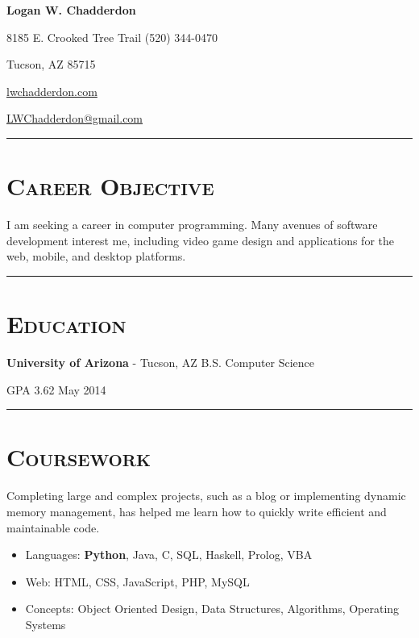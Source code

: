 \documentclass[11pt,letterpaper]{article}
\newcommand{\Hsep}{\vspace{4mm} \hrule \vspace{-1mm}}
\begin{document}
\begin{minipage}{\textwidth}

\begin{center}
\LARGE \bfseries Logan W. Chadderdon
\end{center}

8185 E. Crooked Tree Trail \hfill (520) 344-0470

\vspace{-3mm}
\begin{multicols}{3}
Tucson, AZ 85715 

\begin{center}
\href{http://lwchadderdon.com}{lwchadderdon.com}
\end{center}

\hfill \href{mailto:LWChadderdon@gmail.com}{LWChadderdon@gmail.com}

\end{multicols}


\vspace{-1mm}
\hrule

\section{\scshape Career Objective}
\vspace{-2mm}
I am seeking a career in computer programming.
Many avenues of software development interest me, including video game design and applications for the web, mobile, and desktop platforms.
\Hsep

\section{\scshape Education}
{\bfseries University of Arizona} - Tucson, AZ \hfill B.S. Computer Science

GPA 3.62 \hfill May 2014

\Hsep

\section{\scshape Coursework}
\vspace{-2mm}
Completing large and complex projects, such as a blog or implementing dynamic memory management,
has helped me learn how to quickly write efficient and maintainable code.
\vspace{3mm}
\begin{itemize}
 \item Languages: {\bfseries Python}, Java, C, SQL, Haskell, Prolog, VBA
 \item Web: HTML, CSS, JavaScript, PHP, MySQL
 \item Concepts: Object Oriented Design, Data Structures, Algorithms, Operating Systems
\end{itemize}
\vspace{-3mm}

\end{minipage}
\end{document}
